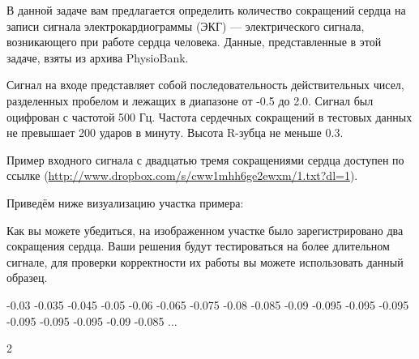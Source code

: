 
В данной задаче вам предлагается определить количество сокращений сердца на записи сигнала 
электрокардиограммы (ЭКГ) — электрического сигнала, возникающего при работе сердца человека. 
Данные, представленные в этой задаче, взяты из архива PhysioBank.

Сигнал на входе представляет собой последовательность действительных чисел, разделенных пробелом и лежащих в диапазоне от -0.5 до 2.0. Сигнал был оцифрован с частотой 500 Гц. Частота сердечных сокращений в тестовых данных не превышает 200 ударов в минуту. Высота R-зубца не меньше 0.3.

Пример входного сигнала с двадцатью тремя сокращениями сердца доступен по ссылке (\url{http://www.dropbox.com/s/cww1mhh6ge2ewxm/1.txt?dl=1}).

Приведём ниже визуализацию участка примера:


Как вы можете убедиться, на изображенном участке было зарегистрировано два сокращения сердца. Ваши 
решения будут тестироваться на более длительном сигнале, для проверки 
корректности их работы вы можете использовать данный образец.

\newpage


\begin{myverbbox}[\small]{\vinput}
    -0.03 -0.035 -0.045 -0.05 -0.06 -0.065 -0.075 -0.08 -0.085 
    -0.09 -0.095 -0.095 -0.095 -0.095 -0.095 -0.095 -0.09 -0.085
    ...
\end{myverbbox}
\begin{myverbbox}[\small]{\voutput}
   2
\end{myverbbox}

